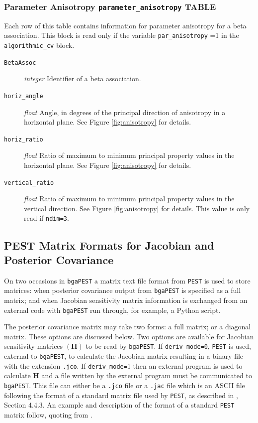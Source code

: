 \documentclass[11pt,oneside,onecolumn]{usgsreport}
\begin{document}
\begin{appendix}
\subsubsection{Parameter Anisotropy \texttt{parameter\_anisotropy} TABLE}

Each row of this table contains information for parameter anisotropy
for a beta association. This block is read only if the variable \texttt{par\_anisotropy}
=1 in the \texttt{algorithmic\_cv} block.
\begin{description}
\item [{\texttt{BetaAssoc}}] \emph{integer} Identifier of a beta association.
\item [{\texttt{horiz\_angle}}] \emph{float }Angle, in degrees of the principal
direction of anisotropy in a horizontal plane. See Figure \ref{fig:anisotropy}
for details.
\item [{\texttt{horiz\_ratio}}] \emph{float }Ratio of maximum to minimum
principal property values in the horizontal plane. See Figure \ref{fig:anisotropy}
for details.
\item [{\texttt{vertical\_ratio}}] \emph{float }Ratio of maximum to minimum
principal property values in the vertical direction. See Figure \ref{fig:anisotropy}
for details. This value is only read if \texttt{ndim=3}.
\end{description}

\subsection{PEST Matrix Formats for Jacobian and Posterior Covariance}

On two occasions in \texttt{bgaPEST} a matrix text file format from
\texttt{PEST} is used to store matrices: when posterior covariance
output from \texttt{bgaPEST} is specified as a full matrix; and when
Jacobian sensitivity matrix information is exchanged from an external
code with \texttt{bgaPEST} run through, for example, a Python script. 

The posterior covariance matrix may take two forms: a full matrix;
or a diagonal matrix. These options are discussed below. Two options
are available for Jacobian sensitivity matrices $\left(\mathbf{H}\right)$
to be read by \texttt{bgaPEST}. If \texttt{deriv\_mode=0}, \texttt{PEST}
is used, external to \texttt{bgaPEST}, to calculate the Jacobian matrix
resulting in a binary file with the extension \texttt{.jco}. If \texttt{deriv\_mode=}1
then an external program is used to calculate $\mathbf{H}$ and a
file written by the external program must be communicated to \texttt{bgaPEST}.
This file can either be a \texttt{.jco} file or a \texttt{.jac} file
which is an ASCII file following the format of a standard matrix file
used by \texttt{PEST}, as described in \citet{PESTAdd}, Section 4.4.3.
An example and description of the format of a standard \texttt{PEST}
matrix follow, quoting from \citet{PESTAdd}.


\end{appendix}
\end{document}
